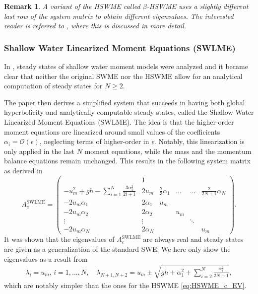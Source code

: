 \documentclass[a4paper, 11pt]{article}
\newtheorem{remark}{Remark}
\begin{document}

\begin{remark}
    A variant of the HSWME called $\beta$-HSWME uses a slightly different last row of the system matrix to obtain different eigenvalues. The interested reader is referred to \cite{Koellermeier2020c}, where this is discussed in more detail.
\end{remark}

\subsubsection{Shallow Water Linearized Moment Equations (SWLME)}
In \cite{Koellermeier2020i}, steady states of shallow water moment models were analyzed and it became clear that neither the original SWME nor the HSWME allow for an analytical computation of steady states for $N\geq 2$.

The paper then derives a simplified system that succeeds in having both global hyperbolicity and analytically computable steady states, called the Shallow Water Linearized Moment Equations (SWLME). The idea is that the higher-order moment equations are linearized around small values of the coefficients $\alpha_i=\mathcal{O}(\epsilon)$, neglecting terms of higher-order in $\epsilon$. Notably, this linearization is only applied in the last $N$ moment equations, while the mass and the momentum balance equations remain unchanged. This results in the following system matrix as derived in \cite{Koellermeier2020i}
\begin{equation}\label{eq:A_SWLME_c}
        A^{\textrm{SWLME}}_{c}=
        \left(\begin{array}{cccccc}
         & 1 &  &  &  &  \\
        -u_m^2 + gh - \sum\limits_{i=1}^{N}\frac{3 \alpha_1^2}{2i+1} & 2u_m & \frac{2}{3} \alpha_1 & \ldots & \ldots & \frac{2}{2N+1} \alpha_N\\
        -2u_m \alpha_1 & 2\alpha_1 & u_m & & &\\
        -2u_m \alpha_2 & 2\alpha_2  &  & u_m &  & \\
        \vdots & \vdots &  &  & \ddots &  \\
        -2u_m \alpha_N & 2\alpha_N &  &  &  & u_m
        \end{array}\right).
\end{equation}
It was shown that the eigenvalues of $A^{\textrm{SWLME}}_{c}$ are always real and steady states are given as a generalization of the standard SWE. We here only show the eigenvalues as a result from \cite{Koellermeier2020i}
\begin{eqnarray}\label{eq:SWLME_c_EV}
    \lambda_i=u_m, \, i=1,\ldots, N, \quad
    \lambda_{N+1,N+2} = u_m \pm \sqrt{gh + \alpha_1^2 + \sum\limits_{i=2}^N\frac{\alpha_i^2}{2N+1}},
\end{eqnarray}
which are notably simpler than the ones for the HSWME \eqref{eq:HSWME_c_EV}.
\end{document}
